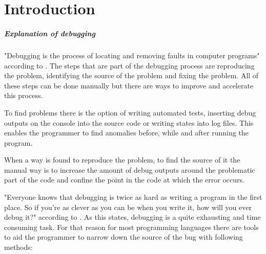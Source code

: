 
\chapter{Introduction}\label{cha:Introduction}

\paragraph{Explanation of debugging}
\label{paragraph:debuging}

"Debugging is the process of locating and removing faults in computer programs" according to . The steps that are part of the debugging process are reproducing the problem, identifying the source of the problem and fixing the problem. All of these steps can be done manually but there are ways to improve and accelerate this process.

To find problems there is the option of writing automated tests, inserting debug outputs on the console into the source code or writing states into log files. This enables the programmer to find anomalies before, while and after running the program.

When a way is found to reproduce the problem, to find the source of it the manual way is to increase the amount of debug outputs around the problematic part of the code and confine the point in the code at which the error occurs.

"Everyone knows that debugging is twice as hard as writing a program in the first place. So if you're as clever as you can be when you write it, how will you ever debug it?" according to . As this states, debugging is a quite exhausting and time consuming task. For that reason for most programming languages there are tools to aid the programmer to narrow down the source of the bug with following methods:

